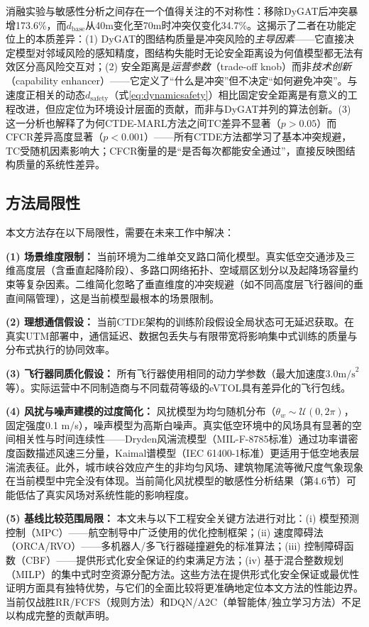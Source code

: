 \documentclass[12pt,a4paper,UTF8]{ctexart}
\begin{document}
消融实验与敏感性分析之间存在一个值得关注的不对称性：移除DyGAT后冲突暴增173.6\%，而$d_{\text{base}}$从40m变化至70m时冲突仅变化34.7\%。这揭示了二者在功能定位上的本质差异：(1) DyGAT的图结构质量是冲突风险的\emph{主导因素}——它直接决定模型对邻域风险的感知精度，图结构失能时无论安全距离设为何值模型都无法有效区分高风险交互对；(2) 安全距离是\emph{运营参数}（trade-off knob）而非\emph{技术创新}（capability enhancer）——它定义了``什么是冲突''但不决定``如何避免冲突''。与速度正相关的动态$d_{\text{safety}}$（式\ref{eq:dynamicsafety}）相比固定安全距离是有意义的工程改进，但应定位为环境设计层面的贡献，而非与DyGAT并列的算法创新。(3) 这一分析也解释了为何CTDE-MARL方法之间TC差异不显著（$p>0.05$）而CFCR差异高度显著（$p<0.001$）——所有CTDE方法都学习了基本冲突规避，TC受随机因素影响大；CFCR衡量的是``是否每次都能安全通过''，直接反映图结构质量的系统性差异。

\subsection{方法局限性}

本文方法存在以下局限性，需要在未来工作中解决：

\textbf{(1) 场景维度限制：} 当前环境为二维单交叉路口简化模型。真实低空交通涉及三维高度层（含垂直起降阶段）、多路口网络拓扑、空域扇区划分以及起降场容量约束等复杂因素。二维简化忽略了垂直维度的冲突规避（如不同高度层飞行器间的垂直间隔管理），这是当前模型最根本的场景限制。

\textbf{(2) 理想通信假设：} 当前CTDE架构的训练阶段假设全局状态可无延迟获取。在真实UTM部署中，通信延迟、数据包丢失与有限带宽将影响集中式训练的质量与分布式执行的协同效率。

\textbf{(3) 飞行器同质化假设：} 所有飞行器使用相同的动力学参数（最大加速度$3.0\text{m/s}^2$等）。实际运营中不同制造商与不同载荷等级的eVTOL具有差异化的飞行包线。

\textbf{(4) 风扰与噪声建模的过度简化：} 风扰模型为均匀随机分布（$\theta_w \sim \mathcal{U}(0, 2\pi)$，固定强度0.1 m/s），噪声模型为高斯白噪声。真实低空环境中的风场具有显著的空间相关性与时间连续性——Dryden风湍流模型（MIL-F-8785标准）通过功率谱密度函数描述风速三分量，Kaimal谱模型（IEC 61400-1标准）更适用于低空地表层湍流表征。此外，城市峡谷效应产生的非均匀风场、建筑物尾流等微尺度气象现象在当前模型中完全没有体现。当前简化风扰模型的敏感性分析结果（第4.6节）可能低估了真实风场对系统性能的影响程度。

\textbf{(5) 基线比较范围局限：} 本文未与以下工程安全关键方法进行对比：(i) 模型预测控制（MPC）——航空制导中广泛使用的优化控制框架；(ii) 速度障碍法（ORCA/RVO）——多机器人/多飞行器碰撞避免的标准算法；(iii) 控制障碍函数（CBF）——提供形式化安全保证的约束满足方法；(iv) 基于混合整数规划（MILP）的集中式时空资源分配方法。这些方法在提供形式化安全保证或最优性证明方面具有独特优势，与它们的全面比较将更准确地定位本文方法的性能边界。当前仅战胜RR/FCFS（规则方法）和DQN/A2C（单智能体/独立学习方法）不足以构成完整的贡献声明。
\end{document}
